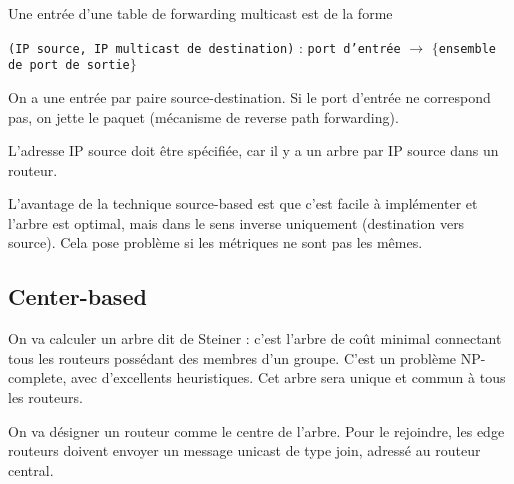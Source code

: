 			Une entrée d'une table de forwarding multicast est de la forme
			
			\begin{center}
\texttt{(IP source, IP multicast de destination)} : \texttt{port d'entrée} $\rightarrow$ $\lbrace$\texttt{ensemble de port de sortie}$\rbrace$
\end{center}
			
			On a une entrée par paire source-destination. Si le port d'entrée ne correspond pas, on jette le paquet (mécanisme de reverse path forwarding).
		
			L'adresse IP source doit être spécifiée, car il y a un arbre par IP source dans un routeur.
		
		
			L'avantage de la technique source-based est que c'est facile à implémenter et l'arbre est optimal, mais dans le sens inverse uniquement (destination vers source). Cela pose problème si les métriques ne sont pas les mêmes.		
		
		
		\subsection{Center-based}
		
		
		
		
		
		On va calculer un arbre dit de Steiner : c'est l'arbre de coût minimal connectant tous les routeurs possédant des membres d'un groupe. C'est un problème NP-complete, avec d'excellents heuristiques. Cet arbre sera unique et commun à tous les routeurs.
		
		On va désigner un routeur comme le centre de l'arbre. Pour le rejoindre, les edge routeurs doivent envoyer un message unicast de type join, adressé au routeur central.
		

